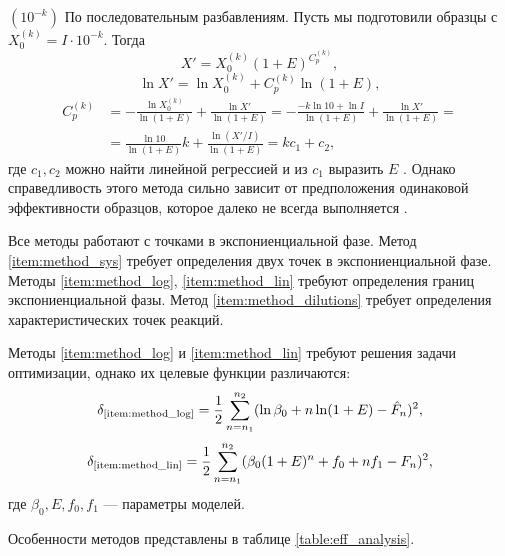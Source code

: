 \begin{labeldesc}
  \item[$(10^{-k})$]\label{item:method_dilutions}
  По последовательным разбавлениям. Пусть мы подготовили образцы с
  $X_0^{(k)}=I\cdot 10^{-k}$. Тогда
  \[
    X'=X_0^{(k)}(1+E)^{C_{p}^{(k)}},
  \]
  \[
    \ln X'=\ln X_0^{(k)}+C_{p}^{(k)}\ln(1+E),
  \]
  \[
    \begin{aligned}
      C_{p}^{(k)}
       & =-\frac{\ln X_0^{(k)}}{\ln(1+E)}+\frac{\ln X'}{\ln(1+E)}=
      -\frac{-k\ln 10+\ln I}{\ln(1+E)}+\frac{\ln X'}{\ln(1+E)}=           \\
       & =\frac{\ln 10}{\ln (1+E)}k+\frac{\ln (X'/I)}{\ln(1+E)}=kc_1+c_2,
    \end{aligned}
  \]
  где $c_1,c_2$ можно найти линейной регрессией и из $c_1$ выразить $E$
  \cite{rasmussenQuantificationLightCycler2001}. Однако справедливость
  этого метода сильно зависит от предположения одинаковой эффективности
  образцов, которое далеко не всегда выполняется
  \cite{ramakersAssumptionfreeAnalysisQuantitative2003}.
\end{labeldesc}

Все методы работают с точками в экспониенциальной фазе. Метод
\ref{item:method_sys} требует определения двух точек в экспониенциальной фазе.
Методы \ref{item:method_log}, \ref{item:method_lin} требуют определения границ
экспониенциальной фазы. Метод \ref{item:method_dilutions} требует определения
характеристических точек реакций.

Методы \ref{item:method_log} и \ref{item:method_lin} требуют решения задачи
оптимизации, однако их целевые функции различаются:
\[
  \delta_{\text{\ref{item:method_log}}}=\frac{1}{2}\sum_{n=n_1}^{n_2}(\ln \beta_0+n\ln(1+E)-\hat F_{n})^{2},
\]
\[
  \delta_{\text{\ref{item:method_lin}}}=\frac{1}{2}\sum_{n=n_1}^{n_2}(\beta_0(1+E)^{n}+f_0+nf_1-F_{n})^{2},
\]
где $\beta_0,E,f_0,f_1$ --- параметры моделей.

Особенности методов представлены в таблице \ref{table:eff_analysis}.

